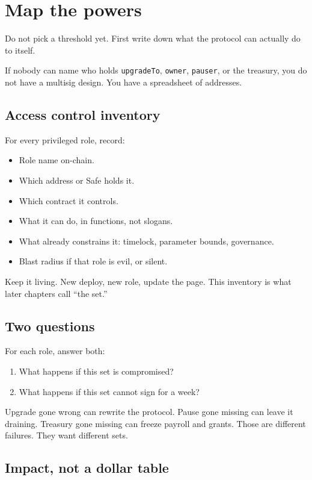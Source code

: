 \chapter{Map the powers}

Do not pick a threshold yet. First write down what
the protocol can actually do to itself.

If nobody can name who holds \texttt{upgradeTo},
\texttt{owner}, \texttt{pauser}, or the treasury,
you do not have a multisig design. You have a
spreadsheet of addresses.

\section{Access control inventory}

For every privileged role, record:

\begin{itemize}
  \item Role name on-chain.
  \item Which address or Safe holds it.
  \item Which contract it controls.
  \item What it can do, in functions, not slogans.
  \item What already constrains it: timelock,
  parameter bounds, governance.
  \item Blast radius if that role is evil, or
  silent.
\end{itemize}

Keep it living. New deploy, new role, update the
page. This inventory is what later chapters call
``the set.''

\section{Two questions}

For each role, answer both:

\begin{enumerate}
  \item What happens if this set is compromised?
  \item What happens if this set cannot sign for
  a week?
\end{enumerate}

Upgrade gone wrong can rewrite the protocol.
Pause gone missing can leave it draining.
Treasury gone missing can freeze payroll and
grants. Those are different failures. They want
different sets.

\section{Impact, not a dollar table}


